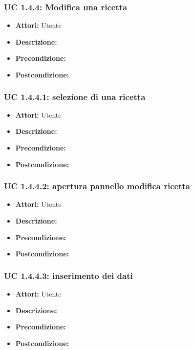 \subsubsection{UC 1.4.4: Modifica una ricetta}

\begin{itemize}
\item \textbf{Attori:} Utente
\item \textbf{Descrizione:} 
\item \textbf{Precondizione:} 
\item \textbf{Postcondizione:} 
\end{itemize}

\subsubsection{UC 1.4.4.1: selezione di una ricetta}

\begin{itemize}
\item \textbf{Attori:} Utente
\item \textbf{Descrizione:} 
\item \textbf{Precondizione:} 
\item \textbf{Postcondizione:} 
\end{itemize}

\subsubsection{UC 1.4.4.2: apertura pannello modifica ricetta}

\begin{itemize}
\item \textbf{Attori:} Utente
\item \textbf{Descrizione:} 
\item \textbf{Precondizione:} 
\item \textbf{Postcondizione:} 
\end{itemize}

\subsubsection{UC 1.4.4.3: inserimento dei dati}

\begin{itemize}
\item \textbf{Attori:} Utente
\item \textbf{Descrizione:} 
\item \textbf{Precondizione:} 
\item \textbf{Postcondizione:} 
\end{itemize}

